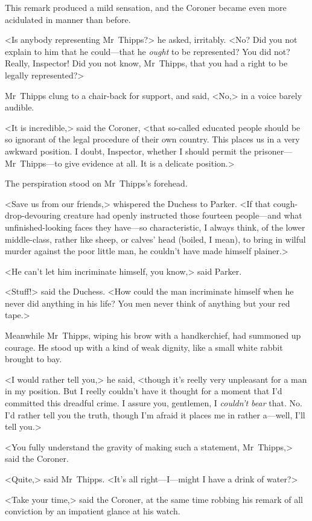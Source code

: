 This remark produced a mild sensation, and the Coroner became even more acidulated in manner than before.

<Is anybody representing Mr~Thipps?> he asked, irritably. <No? Did you not explain to him that he could—that he \textit{ought} to be represented? You did not? Really, Inspector! Did you not know, Mr~Thipps, that you had a right to be legally represented?>

Mr~Thipps clung to a chair-back for support, and said, <No,> in a voice barely audible.

<It is incredible,> said the Coroner, <that so-called educated people should be so ignorant of the legal procedure of their own country. This places us in a very awkward position. I doubt, Inspector, whether I should permit the prisoner—Mr~Thipps—to give evidence at all. It is a delicate position.>

The perspiration stood on Mr~Thipps's forehead.

<Save us from our friends,> whispered the Duchess to Parker. <If that cough-drop-devouring creature had openly instructed those fourteen people—and what unfinished-looking faces they have—so characteristic, I always think, of the lower middle-class, rather like sheep, or calves' head (boiled, I mean), to bring in wilful murder against the poor little man, he couldn't have made himself plainer.>

<He can't let him incriminate himself, you know,> said Parker.

<Stuff!> said the Duchess. <How could the man incriminate himself when he never did anything in his life? You men never think of anything but your red tape.>

Meanwhile Mr~Thipps, wiping his brow with a handkerchief, had summoned up courage. He stood up with a kind of weak dignity, like a small white rabbit brought to bay.

<I would rather tell you,> he said, <though it's reelly very unpleasant for a man in my position. But I reelly couldn't have it thought for a moment that I'd committed this dreadful crime. I assure you, gentlemen, I \textit{couldn't bear} that. No. I'd rather tell you the truth, though I'm afraid it places me in rather a—well, I'll tell you.>

<You fully understand the gravity of making such a statement, Mr~Thipps,> said the Coroner.

<Quite,> said Mr~Thipps. <It's all right—I—might I have a drink of water?>

<Take your time,> said the Coroner, at the same time robbing his remark of all conviction by an impatient glance at his watch.

